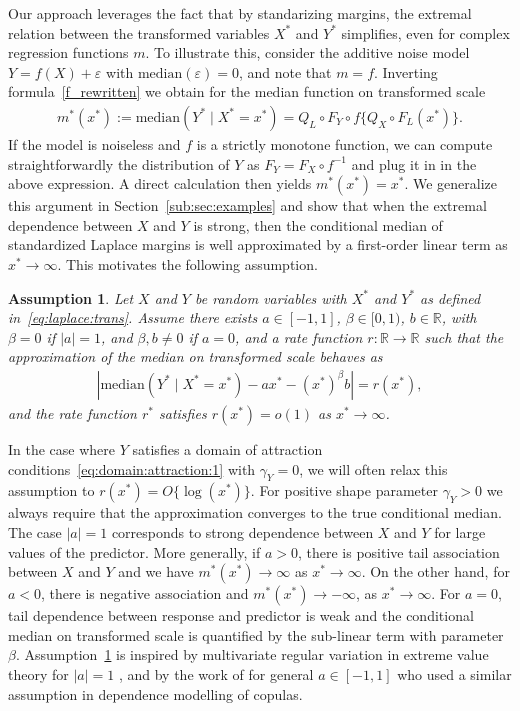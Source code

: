 \documentclass{statsoc}
\newtheorem{assumption}{Assumption}
\theoremstyle{break}
\def\M{\text{median}}
\newcommand{\beao}{\begin{eqnarray*}}
\newcommand{\eeao}{\end{eqnarray*}\noindent}
\begin{document}
Our approach leverages the fact that 
by standarizing margins, the extremal relation between the transformed variables $X^*$ and $Y^*$ simplifies, even for complex regression functions $m$. 
To illustrate this, consider the additive noise model $Y= f(X) + \varepsilon$ with $\M(\varepsilon) =0$, and note that $m=f$.
Inverting formula~\eqref{f_rewritten} we obtain for the median function on transformed scale
\beao 
  m^*(x^*) := \M( Y^* \mid X^* = x^*) =  Q_L \circ F_Y \circ f\{ Q_X \circ F_L (x^*)\}.
\eeao 
If the model is noiseless and $f$ is a strictly monotone function, we can compute straightforwardly the distribution of $Y$ as $F_Y = F_X \circ f^{-1}$ and plug it in in the above expression. A direct calculation then yields $ m^*(x^*) = x^*$. 
We generalize this argument in Section~\ref{sub:sec:examples} and show that when the extremal dependence between $X$ and $Y$ is strong, then the conditional median of standardized Laplace margins is well approximated by a first-order linear term as $x^* \to \infty$. 
This motivates the following assumption.

\begin{assumption}\label{main_assumption_text}
	Let $X$ and $Y$ be random variables with $X^*$ and $Y^*$ as defined in~\eqref{eq:laplace:trans}.	
	Assume there exists $a\in[-1,1]$, $\beta \in [0,1)$, $b \in \mathbb R$,	with $\beta=0$ if $|a|=1$, and $\beta, b \neq0$ if $a=0$, 
	and a rate function $r: \mathbb{R} \to \mathbb{R}$ such that the approximation of the median on transformed scale behaves as
    \begin{align}\label{convergence:median:1}
		| \M( Y^* \mid X^* = x^*) - a x^*  -  (x^*)^\beta b  |  = r(x^*),
	\end{align}
	and the rate function $r^*$ satisfies $r(x^*) = o(1)$ as $x^*\to\infty$.
\end{assumption}

In the case where $Y$ satisfies a domain of attraction conditions~\eqref{eq:domain:attraction:1} with $\gamma_Y = 0$, we will often relax this assumption to $r(x^*) = O\{\log(x^*)\}$. For positive shape parameter $\gamma_Y>0$ we always require that the approximation converges to the true conditional median. 
The case $|a| = 1$ corresponds to strong dependence between $X$ and $Y$ for large values of the predictor.
More generally, if $a > 0$, there is positive tail association between $X$ and $Y$ and we have $m^*(x^*) \to \infty$ as $x^* \to \infty$. On the other hand, for $a< 0$, there is negative association and $m^*(x^*)  \to - \infty$, as $x^* \to \infty$.
For $a=0$, tail dependence between response and predictor is weak and the conditional median on transformed scale is quantified by the sub-linear term with parameter $\beta$. 
Assumption~\ref{main_assumption_text} is inspired by multivariate regular variation in extreme value theory for $|a|=1$ \citep{resnick:2007}, and by the work of \cite{heffernan:tawn:2004} for general $a\in[-1,1]$ who used a similar assumption in dependence modelling of copulas.
\end{document}
